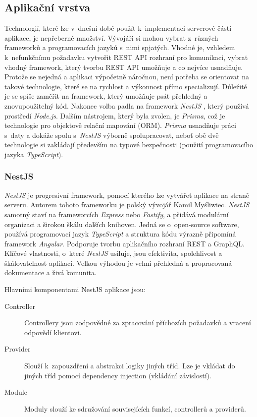 \documentclass[thesis=M,czech]{FITthesis}[2019/12/23]
\begin{document}
\subsection{Aplikační vrstva}
Technologií, které lze v~dnešní době použít k~implementaci serverové části aplikace, je nepřeberné množství. Vývojáři si mohou vybrat z~různých frameworků a programovacích jazyků s~nimi spjatých. Vhodné je, vzhledem k~nefunkčnímu požadavku vytvořit REST API rozhraní pro komunikaci, vybrat vhodný framework, který tvorbu REST API umožňuje a co nejvíce usnadňuje. Protože se nejedná a aplikaci výpočetně náročnou, není potřeba se orientovat na takové technologie, které se na rychlost a výkonnost přímo specializují. Důležité je se spíše zaměřit na framework, který umožňuje psát přehledný a znovupoužitelný kód. Nakonec volba padla na framework \textit{NestJS} \cite{nestjs}, který používá prostředí \textit{Node.js}. Dalším nástrojem, který byla zvolen, je \textit{Prisma}, což je technologie pro objektově relační mapování (ORM). \textit{Prisma} usnadňuje práci s~daty a dokáže spolu s~\textit{NestJS} výborně spolupracovat, neboť obě dvě technologie si zakládají především na typové bezpečnosti (použití programovacího jazyka \textit{TypeScript}).

\subsubsection{NestJS}
\textit{NestJS} je progresivní framework, pomocí kterého lze vytvářet aplikace na straně serveru. Autorem tohoto frameworku je polský vývojář Kamil Myśliwiec. \textit{NestJS} samotný staví na frameworcích \textit{Express} nebo \textit{Fastify}, a přidává modulární organizaci a širokou škálu dalších knihoven. Jedná se o~open-source software, používá programovací jazyk \textit{TypeScript} a struktura kódu výrazně připomíná framework \textit{Angular}. Podporuje tvorbu aplikačního rozhraní REST a GraphQL. Klíčové vlastnosti, o~které \textit{NestJS} usiluje, jsou efektivita, spolehlivost a škálovatelnost aplikací. Velkou výhodou je velmi přehledná a propracovaná dokumentace a živá komunita. \cite{nestjs, nestjs-1, nestjs-2}

Hlavními komponentami NestJS aplikace jsou:
\begin{description}
    \item[Controller] Controllery jsou zodpovědné za zpracování příchozích požadavků a vracení odpovědí klientovi.
    \item[Provider] Slouží k~zapouzdření a abstrakci logiky jiných tříd. Lze je vkládat do jiných tříd pomocí dependency injection (vkládání závislostí).
    \item[Module] Moduly slouží ke sdružování souvisejících funkcí, controllerů a providerů.
\end{description}
\end{document}
